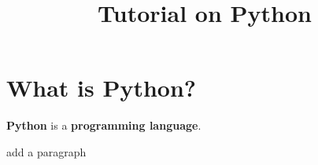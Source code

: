 \documentclass[12pt]{article}
\title{Tutorial on Python}
\begin{document}
\maketitle
\singlespacing
\section{What is Python?}
\par \textbf{Python} is a \textbf{programming language}.
\par add a paragraph
\end{document}
